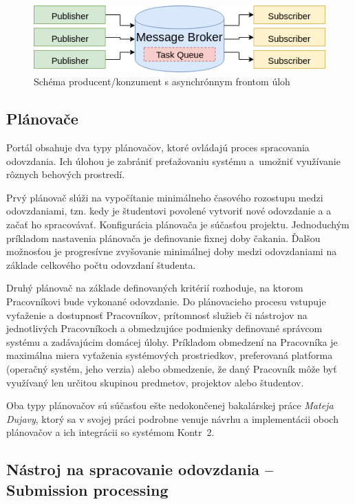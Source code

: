 \documentclass[
  digital, %
  oneside, %
  table,   %
  lof,     %
  lot,   %
]{fithesis3}
\begin{document}
\begin{figure}[!ht]
  \begin{center}
    \includegraphics[width=\textwidth]{imgs/task-queue.png}
  \end{center}
    \caption{Schéma producent/konzument s asynchrónnym frontom úloh}
    \label{fig:task-queue}
\end{figure}

\subsection{Plánovače}
\label{portal-scheduler}

Portál obsahuje dva typy plánovačov, ktoré ovládajú proces spracovania odovzdania. Ich úlohou je zabrániť preťažovaniu systému a~umožniť využívanie rôznych behových prostredí.

Prvý plánovač slúži na vypočítanie minimálneho časového rozostupu medzi odovzdaniami, tzn. kedy je študentovi povolené vytvoriť nové odovzdanie a a začať ho spracovávať. Konfigurácia plánovača je súčasťou projektu. Jednoduchým príkladom nastavenia plánovača je definovanie fixnej doby čakania. Ďalšou možnosťou je progresívne zvyšovanie minimálnej doby medzi odovzdaniami na základe celkového počtu odovzdaní študenta.

Druhý plánovač na základe definovaných kritérií rozhoduje, na ktorom Pracovníkovi bude vykonané odovzdanie. Do plánovacieho procesu vstupuje vyťaženie a dostupnosť Pracovníkov, prítomnosť služieb či nástrojov na jednotlivých Pracovníkoch a obmedzujúce podmienky definované správcom systému a zadávajúcim domácej úlohy. Príkladom obmedzení na Pracovníka je maximálna miera vyťaženia systémových prostriedkov, preferovaná platforma (operačný systém, jeho verzia) alebo obmedzenie, že daný Pracovník môže byť využívaný len určitou skupinou predmetov, projektov alebo študentov. 

Oba typy plánovačov sú súčasťou ešte nedokončenej bakalárskej práce \emph{Mateja Dujavy}\cite{kontr-scheduler}, ktorý sa v svojej práci podrobne venuje návrhu a implementácii oboch plánovačov a ich integrácii so systémom Kontr~2.

\subsection{Nástroj na spracovanie odovzdania -- Submission processing}
\end{document}
